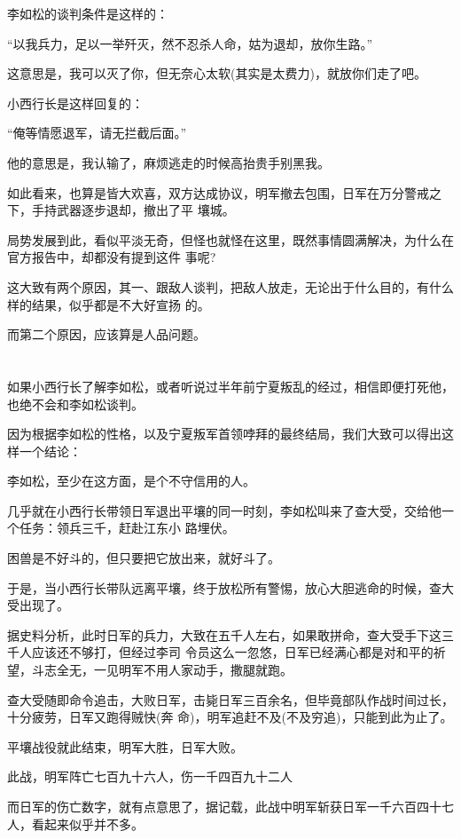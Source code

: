 \documentclass[11pt,a4paper,onecolumn]{article}
\begin{document}
李如松的谈判条件是这样的：

``以我兵力，足以一举歼灭，然不忍杀人命，姑为退却，放你生路。''

这意思是，我可以灭了你，但无奈心太软(其实是太费力)，就放你们走了吧。

小西行长是这样回复的：

``俺等情愿退军，请无拦截后面。''

他的意思是，我认输了，麻烦逃走的时候高抬贵手别黑我。

如此看来，也算是皆大欢喜，双方达成协议，明军撤去包围，日军在万分警戒之下，手持武器逐步退却，撤出了平
壤城。

局势发展到此，看似平淡无奇，但怪也就怪在这里，既然事情圆满解决，为什么在官方报告中，却都没有提到这件
事呢?

这大致有两个原因，其一、跟敌人谈判，把敌人放走，无论出于什么目的，有什么样的结果，似乎都是不大好宣扬
的。

而第二个原因，应该算是人品问题。

\section[\thesection]{}

如果小西行长了解李如松，或者听说过半年前宁夏叛乱的经过，相信即便打死他，也绝不会和李如松谈判。

因为根据李如松的性格，以及宁夏叛军首领哱拜的最终结局，我们大致可以得出这样一个结论：

李如松，至少在这方面，是个不守信用的人。

几乎就在小西行长带领日军退出平壤的同一时刻，李如松叫来了查大受，交给他一个任务：领兵三千，赶赴江东小
路埋伏。

困兽是不好斗的，但只要把它放出来，就好斗了。

于是，当小西行长带队远离平壤，终于放松所有警惕，放心大胆逃命的时候，查大受出现了。

据史料分析，此时日军的兵力，大致在五千人左右，如果敢拼命，查大受手下这三千人应该还不够打，但经过李司
令员这么一忽悠，日军已经满心都是对和平的祈望，斗志全无，一见明军不用人家动手，撒腿就跑。

查大受随即命令追击，大败日军，击毙日军三百余名，但毕竟部队作战时间过长，十分疲劳，日军又跑得贼快(奔
命)，明军追赶不及(不及穷追)，只能到此为止了。

平壤战役就此结束，明军大胜，日军大败。

此战，明军阵亡七百九十六人，伤一千四百九十二人

而日军的伤亡数字，就有点意思了，据记载，此战中明军斩获日军一千六百四十七人，看起来似乎并不多。
\end{document}
